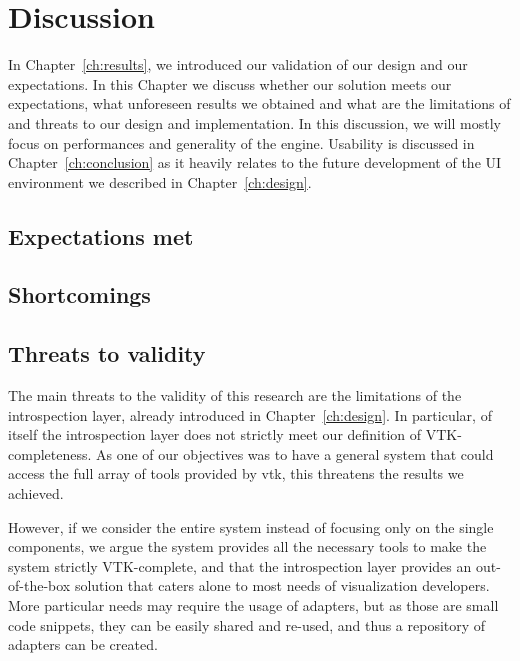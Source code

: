 \chapter{Discussion}
\label{ch:discussion}

In Chapter~\ref{ch:results}, we introduced our validation of our design and our expectations. In this Chapter we discuss whether our solution meets our expectations, what unforeseen results we obtained and what are the limitations of and threats to our design and implementation. In this discussion, we will mostly focus on performances and generality of the engine. Usability is discussed in Chapter~\ref{ch:conclusion} as it heavily relates to the future development of the UI environment we described in Chapter~\ref{ch:design}.

\section{Expectations met}

\section{Shortcomings}




\section{Threats to validity}

The main threats to the validity of this research are the limitations of the introspection layer, already introduced in Chapter~\ref{ch:design}. In particular, of itself the introspection layer does not strictly meet our definition of VTK-completeness. As one of our objectives was to have a general system that could access the full array of tools provided by \acrshort{vtk}, this threatens the results we achieved.

However, if we consider the entire system instead of focusing only on the single components, we argue the system provides all the necessary tools to make the system strictly VTK-complete, and that the introspection layer provides an out-of-the-box solution that caters alone to most needs of visualization developers. More particular needs may require the usage of adapters, but as those are small code snippets, they can be easily shared and re-used, and thus a repository of adapters can be created.

